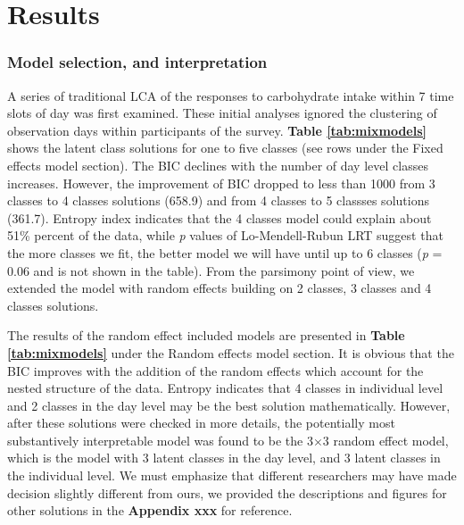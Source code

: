 
\chapter{Results} %

\label{Chapter 3} %


\vspace{-0.7cm}


\subsection{Model selection, and interpretation}\vspace{-0.4cm}

A series of traditional LCA of the responses to carbohydrate intake within 7 time slots of day was first examined. These initial analyses ignored the clustering of observation days within participants of the survey. \textbf{Table \ref{tab:mixmodels}} shows the latent class solutions for one to five classes (see rows under the Fixed effects model section). The BIC declines with the number of day level classes increases. However, the improvement of BIC dropped to less than 1000 from 3 classes to 4 classes solutions (658.9) and from 4 classes to 5 classses solutions (361.7). Entropy index indicates that the 4 classes model could explain about 51\% percent of the data, while \textit{p} values of Lo-Mendell-Rubun LRT suggest that the more classes we fit, the better model we will have until up to 6 classes (\textit{p} = 0.06 and is not shown in the table). From the parsimony point of view, we extended the model with random effects building on 2 classes, 3 classes and 4 classes solutions. 

The results of the random effect included models are presented in \textbf{Table \ref{tab:mixmodels}} under the Random effects model section. It is obvious that the BIC improves with the addition of the random effects which account for the nested structure of the data. Entropy indicates that 4 classes in individual level and 2 classes in the day level may be the best solution mathematically. However, after these solutions were checked in more details, the potentially most substantively interpretable model was found to be the 3$\times$3 random effect model, which is the model with 3 latent classes in the day level, and 3 latent classes in the individual level. We must emphasize that different researchers may have made decision slightly different from ours, we provided the descriptions and figures for other solutions in the \textbf{Appendix xxx} for reference. 

